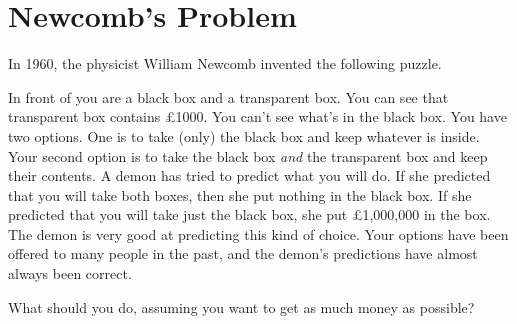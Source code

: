 


\section{Newcomb's Problem}

In 1960, the physicist William Newcomb invented the following puzzle.

\begin{example}
  In front of you are a black box and a transparent box. You can see
  that transparent box contains £1000. You can't see what's in the
  black box. You have two options. One is to take (only) the black box
  and keep whatever is inside. Your second option is to take the black
  box \emph{and} the transparent box and keep their contents. A demon
  has tried to predict what you will do. If she predicted that you
  will take both boxes, then she put nothing in the black box. If she
  predicted that you will take just the black box, she put £1,000,000
  in the box. The demon is very good at predicting this kind of
  choice. Your options have been offered to many people in the past,
  and the demon's predictions have almost always been correct.
\end{example}
%
What should you do, assuming you want to get as much money as
possible?

